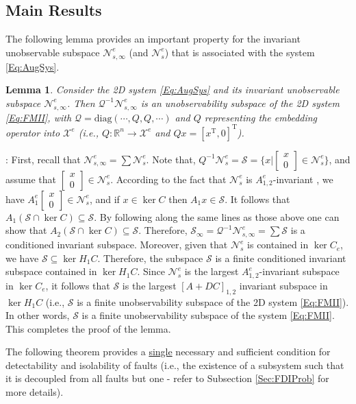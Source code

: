 \documentclass[journal,12pt,draftcls,onecolumn]{IEEEtran}
\newcommand{\tran}{\mathrm{T}}
\newcommand{\bsm}{\begin{smallmatrix}}
\newcommand{\esm}{\end{smallmatrix}}
\newcommand{\diag}{\mathrm{diag}}
\newcommand{\ssp}[1]{\mathscr{#1}}      \newcommand{\setssp}[1]{\mathfrak{#1}}   \newcommand{\fld}[1]{\mathbb{#1}}       \newcommand{\op}[1]{\mathcal{#1}}       \newcommand{\sumbanach}[1]{\sum{#1}}
\def\QEDclosed{\hfill\IEEEQEDclosed}
\renewcommand{\qed}{\QEDclosed}
\renewenvironment{proof}[1][\proofname]{\noindent\nobreakspace{\bfseries #1}:\;}{\qed\par}
\newtheorem{lemma}{Lemma}
\begin{document}
\subsection{Main Results}\label{Sec:FDIMainResult}
The following lemma provides an important property for the invariant unobservable subspace $\ssp{N}_{s,\infty}^e$ (and $\ssp{N}_s^e$) that is associated with the system \eqref{Eq:AugSys}.
\begin{lemma}\label{Lem:UnobsTot2Small}
	Consider the 2D system \eqref{Eq:AugSys} and its invariant unobservable subspace $\ssp{N}_{s,\infty}^e$. Then $\op{Q}^{-1}\ssp{N}^e_{s,\infty}$ is an unobservability subspace of the 2D system \eqref{Eq:FMII}, with $\op{Q} = \diag(\cdots,Q,Q,\cdots)$ and $Q$ representing the embedding operator into $\ssp{X}^e$ (i.e., $Q:\fld{R}^n\rightarrow\ssp{X}^e$ and $Qx = [x^\tran, 0]^\tran$).
\end{lemma}
\begin{proof}
	First, recall that $\ssp{N}_{s,\infty}^e = \sum \ssp{N}_s^e$.
	Note that, $Q^{-1}\ssp{N}_s^e= \ssp{S}=\{x | \left[\bsm x\\0\esm\right] \in \ssp{N}_s^e\}$, and assume that $\left[\bsm x\\0\esm\right]\in \ssp{N}_s^e$. According to the fact that $\ssp{N}_s^e$ is $A^e_{1,2}$-invariant \cite{ACC2013}, we have $A_1^e\left[\bsm x\\0\esm\right]\in\ssp{N}_s^e$, and if $x\in\ker C$ then $A_1x\in \ssp{S}$. It follows that $A_1( \ssp{S}\cap\ker C)\subseteq \ssp{S}$. By following along the same lines as those above one can show that $A_2(\ssp{S}\cap\ker C)\subseteq \ssp{S}$. Therefore, $\ssp{S}_\infty=\op{Q}^{-1}\ssp{N}^e_{s,\infty}=\sum \ssp{S}$ is a conditioned invariant subspace.
	Moreover, given that $\ssp{N}_s^e$ is contained in $\ker C_e$, we have $\ssp{S}\subseteq\ker H_1C$. Therefore, the subspace $\ssp{S}$ is a finite conditioned invariant subspace contained in $\ker {H_1C}$. Since $\ssp{N}_s^e$ is the largest $A_{1,2}^e$-invariant subspace in $\ker C_e$, it follows that $\ssp{S}$ is the largest $[A+DC]_{1,2}$ invariant subspace in $\ker H_1C$ (i.e., $\ssp{S}$ is a finite unobservability subspace of the 2D system \eqref{Eq:FMII}). In other words, $\ssp{S}$ is a finite unobservability subspace of the system \eqref{Eq:FMII}. This completes the proof of the lemma.
\end{proof}
The following theorem provides a \underline{single} necessary and  sufficient condition for detectability and isolability of faults (i.e., the existence  of a subsystem such that it is decoupled from all faults but one - refer to  Subsection \ref{Sec:FDIProb} for more details).
\end{document}
